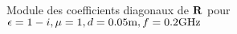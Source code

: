     \begin{figure}[!hbt]
      \centering
      
      \caption[CIOE sur empilement de B.~Stupfel p.~1661]{Module des coefficients diagonaux de \(\mathbf{R}\) pour \(\epsilon = 1-i, \mu = 1, d=0.05\text{m}, f=0.2\text{GHz}\)}
      \label{fig:reflex_fourier:plan:stupfel:hoibc}
    \end{figure}